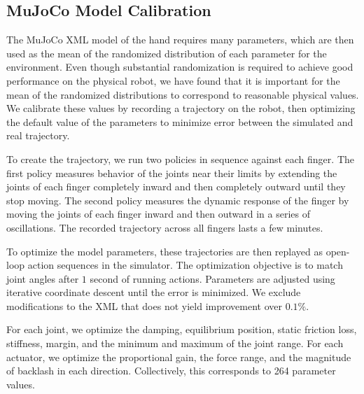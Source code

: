 \subsection{MuJoCo Model Calibration}
\label{app:model-calibration}

The MuJoCo XML model of the hand requires many parameters, which are then used as the mean of the randomized distribution of each parameter for the environment. Even though substantial randomization is required to achieve good performance on the physical robot, we have found that it is important for the mean of the randomized distributions to correspond to reasonable physical values. We calibrate these values by recording a trajectory on the robot, then optimizing the default value of the parameters to minimize error between the simulated and real trajectory.


To create the trajectory, we run two policies in sequence against each finger. The first policy measures behavior of the joints near their limits by extending the joints of each finger completely inward and then completely outward until they stop moving. The second policy measures the dynamic response of the finger by moving the joints of each finger inward and then outward in a series of oscillations. The recorded trajectory across all fingers lasts a few minutes.


To optimize the model parameters, these trajectories are then replayed as open-loop action sequences in the simulator. 
The optimization objective is to match joint angles after $1$ second of running actions. Parameters 
are adjusted using iterative coordinate descent until the error is minimized. We exclude modifications to the XML
that does not yield improvement over $0.1\%$.


For each joint, we optimize the damping, equilibrium position, static friction loss, stiffness, margin, and the minimum and maximum of the joint range. For each actuator, we optimize the proportional gain, the force range, and the magnitude of backlash in each direction.  Collectively, this corresponds to 264 parameter values.


